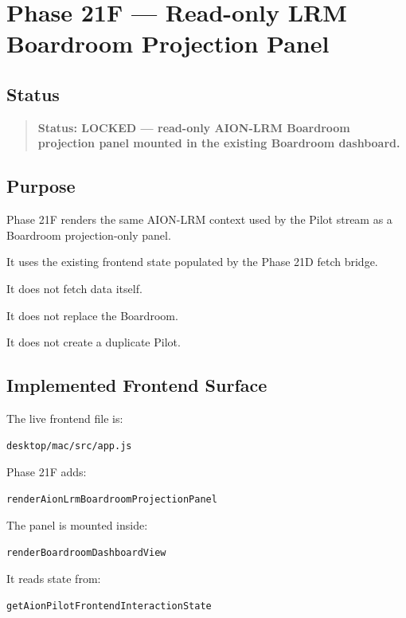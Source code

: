 \section{Phase 21F --- Read-only LRM Boardroom Projection Panel}
\label{sec:phase21f-lrm-boardroom-projection-panel-lock}

\subsection{Status}

\begin{quote}
\textbf{Status: LOCKED --- read-only AION-LRM Boardroom projection panel mounted in the existing Boardroom dashboard.}
\end{quote}

\subsection{Purpose}

Phase 21F renders the same AION-LRM context used by the Pilot stream as a Boardroom projection-only panel.

It uses the existing frontend state populated by the Phase 21D fetch bridge.

It does not fetch data itself.

It does not replace the Boardroom.

It does not create a duplicate Pilot.

\subsection{Implemented Frontend Surface}

The live frontend file is:

\begin{verbatim}
desktop/mac/src/app.js
\end{verbatim}

Phase 21F adds:

\begin{verbatim}
renderAionLrmBoardroomProjectionPanel
\end{verbatim}

The panel is mounted inside:

\begin{verbatim}
renderBoardroomDashboardView
\end{verbatim}

It reads state from:

\begin{verbatim}
getAionPilotFrontendInteractionState
\end{verbatim}

